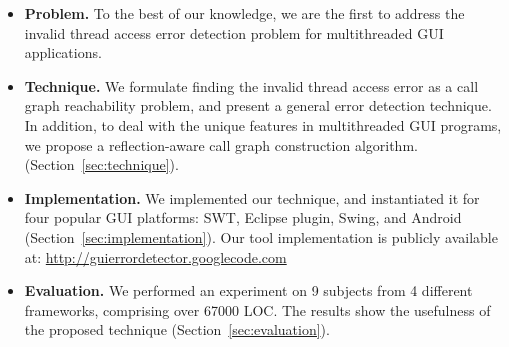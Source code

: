 \begin{itemize}
\item \textbf{Problem.} To the best of our knowledge, we are the first to address
the invalid thread access error detection problem for multithreaded GUI applications.

\item \textbf{Technique.} We formulate finding
the invalid thread access error as a call graph reachability problem,
and present a general error detection technique.
In addition, to deal with the unique features in
multithreaded GUI programs, we propose a reflection-aware
call graph construction algorithm. (Section~\ref{sec:technique}).

\item \textbf{Implementation.} We implemented our technique, and
instantiated it for four
popular GUI platforms: SWT, Eclipse plugin, Swing, and Android (Section~\ref{sec:implementation}). Our
tool implementation is publicly available at:
\url{http://guierrordetector.googlecode.com}

\item \textbf{Evaluation.} We performed an experiment on 9 subjects
from 4 different frameworks, comprising over 67000 LOC. The results
show the usefulness of the proposed technique (Section~\ref{sec:evaluation}).

\end{itemize}

